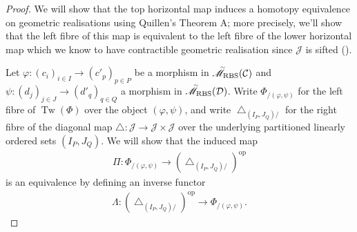 \documentclass[12pt, reqno]{amsart}
\theoremstyle{plain}
\theoremstyle{definition}
\renewcommand{\phi}{\varphi}
\begin{document}
\begin{proof}
We will show that the top horizontal map induces a homotopy equivalence on geometric realisations using Quillen's Theorem A; more precisely, we'll show that the left fibre of this map is equivalent to the left fibre of the lower horizontal map which we know to have contractible geometric realisation since $\mathcal{J}$ is sifted ().

Let $\phi\colon (c_i)_{i\in I}\rightarrow ({c'}_{\! p})_{p\in P}$ be a morphism in $\accentset{\sim}{\mathscr{M}}_{\operatorname{RBS}}(\mathcal{C})$ and $\psi\colon (d_j)_{j\in J}\rightarrow ({d'}_{\! q})_{q\in Q}$ a morphism in $\accentset{\sim}{\mathscr{M}}_{\operatorname{RBS}}(\mathcal{D})$. Write $\Phi_{/(\phi,\psi)}$ for the left fibre of $\operatorname{Tw}(\Phi)$ over the object $(\phi,\psi)$, and write $\bigtriangleup_{(I_P,J_Q)/}$ for the right fibre of the diagonal map $\bigtriangleup\colon \mathcal{J}\rightarrow \mathcal{J}\times \mathcal{J}$ over the underlying partitioned linearly ordered sets $(I_P,J_Q)$. We will show that the induced map
\begin{align*}
\Pi\colon \Phi_{/(\phi,\psi)}\longrightarrow (\bigtriangleup_{(I_P,J_Q)/})^{\operatorname{op}}
\end{align*}
is an equivalence by defining an inverse functor
\begin{align*}
\Lambda\colon(\bigtriangleup_{(I_P,J_Q)/})^{\operatorname{op}}\longrightarrow \Phi_{/(\phi,\psi)}.
\end{align*}


\end{proof}
\end{document}
